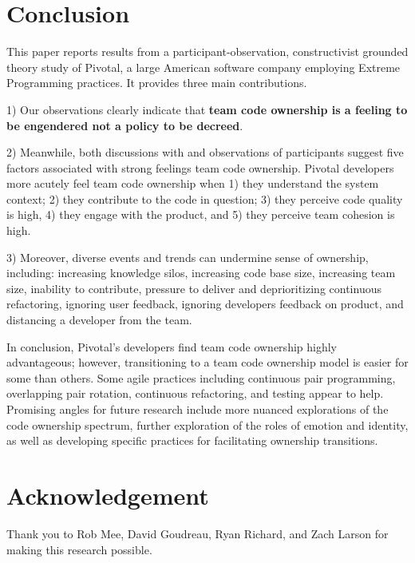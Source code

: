 \section{Conclusion}
\label{Conclusion}
This paper reports results from a participant-observation, constructivist grounded theory study of Pivotal, a large American software company employing Extreme Programming practices. It provides three main contributions.

1) Our observations clearly indicate that \textbf{team code ownership is a feeling to be engendered not a policy to be decreed}.

2) Meanwhile, both discussions with and observations of participants suggest five factors associated with strong feelings team code ownership. Pivotal developers more acutely feel team code ownership when 1) they understand the system context; 2) they contribute to the code in question; 3) they perceive code quality is high, 4) they engage with the product, and 5) they perceive team cohesion is high.   

3) Moreover, diverse events and trends can undermine sense of ownership, including:  increasing knowledge silos, increasing code base size, increasing team size, inability to contribute, pressure to deliver and deprioritizing continuous refactoring, ignoring user feedback, ignoring developers feedback on product, and distancing a developer from the team. 

In conclusion, Pivotal's developers find team code ownership highly advantageous; however, transitioning to a team code ownership model is easier for some than others. Some agile practices including continuous pair programming, overlapping pair rotation, continuous refactoring, and testing appear to help. Promising angles for future research include more nuanced explorations of the code ownership spectrum, further exploration of the roles of emotion and identity, as well as developing specific practices for facilitating ownership transitions. 

\section{Acknowledgement}
Thank you to Rob Mee, David Goudreau, Ryan Richard, and Zach Larson for making this research possible.
